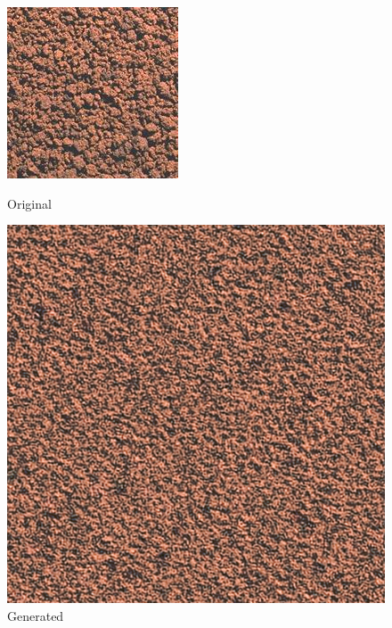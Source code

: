 \documentclass{article}
\begin{document}
    \begin{figure}[!htb]
    \begin{center}
      \includegraphics[scale=.34]{5/report/steerable/14.png}
      \caption{Original}
    \end{center}
    \endminipage \hfill
    \begin{center}
      \includegraphics[scale=.34]{5/report/steerable/14_c.png}
      \caption{Generated}
    \end{center}
    \endminipage
    \end{figure} 
\end{document}
